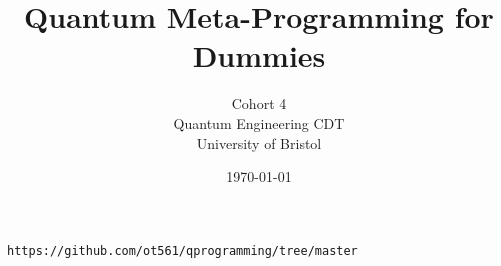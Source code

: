 \documentclass[12pt]{article}
\begin{document}
\title{Quantum Meta-Programming for Dummies}
    \author{Cohort 4 \\[0.5em] Quantum Engineering CDT \\ University of Bristol}
    \date{\today}
    \maketitle



\tableofcontents
\newpage






\newpage


\newpage









\begin{verbatim}
https://github.com/ot561/qprogramming/tree/master
\end{verbatim}




\end{document}

